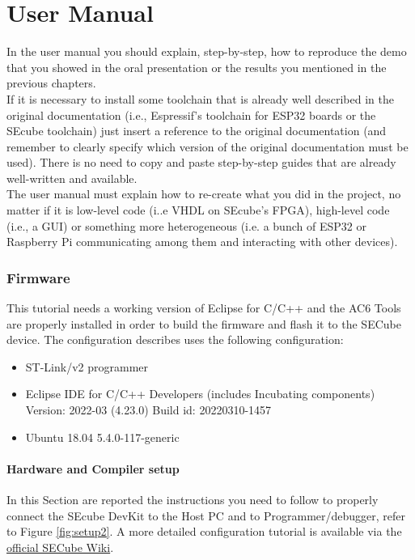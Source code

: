 \chapter{User Manual}
\label{usermanual}



In the user manual you should explain, step-by-step, how to reproduce the demo that you showed in the oral presentation or the results you mentioned in the previous chapters.\\ If it is necessary to install some toolchain that is already well described in the original documentation (i.e., Espressif's toolchain for ESP32 boards or the SEcube toolchain) just insert a reference to the original documentation (and remember to clearly specify which version of the original documentation must be used). There is no need to copy and paste step-by-step guides that are already well-written and available.\\The user manual must explain how to re-create what you did in the project, no matter if it is low-level code (i..e VHDL on SEcube's FPGA), high-level code (i.e., a GUI) or something more heterogeneous (i.e. a bunch of ESP32 or Raspberry Pi communicating among them and interacting with other devices).


\subsection{Firmware}
This tutorial needs a working version of Eclipse for C/C++ and the AC6 Tools are properly installed in order to build the firmware and flash it to the SECube device. The configuration describes uses the following configuration:
\begin{itemize}
	\item ST-Link/v2 programmer
	\item Eclipse IDE for C/C++ Developers (includes Incubating components) Version: 2022-03 (4.23.0) Build id: 20220310-1457
	\item Ubuntu 18.04 5.4.0-117-generic
\end{itemize}

\subsubsection{Hardware and Compiler setup}
In this Section are reported the instructions you need to follow to properly connect the SEcube DevKit to the Host PC and to Programmer/debugger, refer to Figure \ref{fig:setup2}. A more detailed configuration tutorial is available via the  \href{https://github.com/SEcube-Project/SEcube-SDK/blob/master/wiki/wiki_rel_012.pdf}{official SECube Wiki}.

